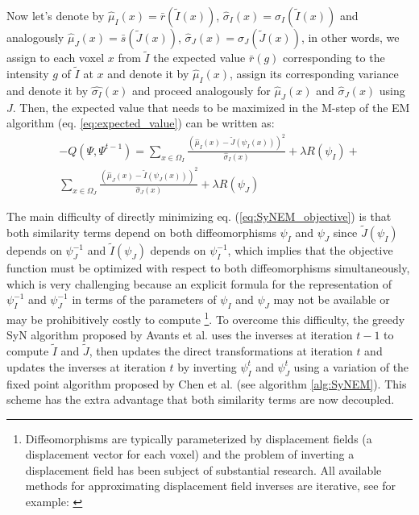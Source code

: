 Now let's denote by $\hat{\mu}_{I}(x) = \bar{r}(\tilde{I}(x))$, $\hat{\sigma}_{I}(x) = \sigma_{I}(\tilde{I}(x))$ and analogously
$\hat{\mu}_{J}(x) = \bar{s}(\tilde{J}(x))$, $\hat{\sigma}_{J}(x) = \sigma_{J}(\tilde{J}(x))$, in other words, we assign to each voxel $x$ from
$\tilde{I}$ the expected value $\bar{r}(g)$ corresponding to the intensity $g$ of $\tilde{I}$ at $x$ and denote it by $\hat{\mu}_{I}(x)$, assign
its corresponding variance and denote it by $\hat{\sigma_{I}}(x)$ and proceed analogously for $\hat{\mu}_{J}(x)$ and $\hat{\sigma}_{J}(x)$ using $J$.
Then, the expected value that needs to be maximized in the M-step of the EM algorithm (eq. \ref{eq:expected_value}) can be written as:
\begin{align}\label{eq:SyNEM_objective}
    -Q(\Psi, \Psi^{t-1}) = \sum_{x \in \Omega_{I}} \frac{(\hat{\mu}_{I}(x) - \tilde{J}(\psi_{I}(x)))^{2}}{\hat{\sigma}_{I}(x)} + \lambda R(\psi_{I}) + \\
    \nonumber\sum_{x \in \Omega_{J}} \frac{(\hat{\mu}_{J}(x) - \tilde{I}(\psi_{J}(x)))^{2}}{\hat{\sigma}_{J}(x)} + \lambda R(\psi_{J})
\end{align}

The main difficulty of directly minimizing eq. (\ref{eq:SyNEM_objective}) is that both similarity terms depend on both diffeomorphisms
$\psi_{I}$ and $\psi_{J}$ since $\tilde{J}(\psi_{I})$ depends on $\psi_{J}^{-1}$ and $\tilde{I}(\psi_{J})$ depends on $\psi_{I}^{-1}$, which implies that the
objective function must be optimized with respect to both diffeomorphisms simultaneously, which is very challenging because an explicit formula for the representation
of $\psi_{I}^{-1}$ and $\psi_{J}^{-1}$ in terms of the parameters of $\psi_{I}$ and $\psi_{J}$ may not be available or may be prohibitively costly to compute
\footnote{Diffeomorphisms are typically parameterized by displacement fields (a displacement vector for each voxel) and the problem of inverting a displacement field
has been subject of substantial research. All available methods for approximating displacement field inverses are iterative, see for example:
\cite{Chen2008}\cite{Avants2009}\cite{Christensen2001}\cite{Crum2007}\cite{Yan2010}}. To overcome this difficulty, the greedy SyN algorithm proposed by Avants et al.
\cite{Avants2011} uses the inverses at iteration $t-1$ to compute $\tilde{I}$ and $\tilde{J}$, then updates the direct transformations at iteration $t$ and updates the
inverses at iteration $t$ by inverting $\psi_{I}^{t}$ and $\psi_{J}^{t}$ using a variation of the fixed point algorithm proposed by Chen et al.\cite{Chen2008} (see
algorithm \ref{alg:SyNEM}). This scheme has the extra advantage that both similarity terms are now decoupled.\\



